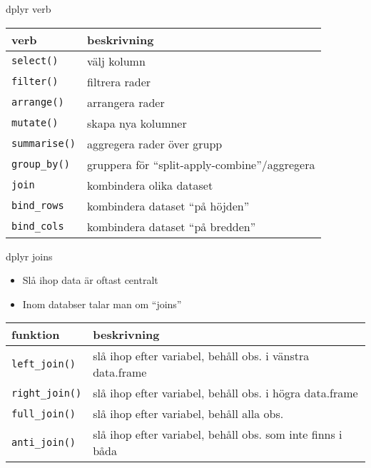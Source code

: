 \documentclass[
  11pt,
  ignorenonframetext,
  handout]{beamer}
\providecommand{\tightlist}{%
  \setlength{\itemsep}{0pt}\setlength{\parskip}{0pt}}
\begin{document}
\begin{frame}[fragile]{dplyr verb}
\protect\hypertarget{dplyr-verb}{}
\begin{longtable}[]{@{}ll@{}}
\toprule
verb & beskrivning \\
\midrule
\endhead
\texttt{select()} & välj kolumn \\
\texttt{filter()} & filtrera rader \\
\texttt{arrange()} & arrangera rader \\
\texttt{mutate()} & skapa nya kolumner \\
\texttt{summarise()} & aggregera rader över grupp \\
\texttt{group\_by()} & gruppera för ``split-apply-combine''/aggregera \\
\texttt{join} & kombindera olika dataset \\
\texttt{bind\_rows} & kombindera dataset ``på höjden'' \\
\texttt{bind\_cols} & kombindera dataset ``på bredden'' \\
\bottomrule
\end{longtable}
\end{frame}

\begin{frame}[fragile]{dplyr joins}
\protect\hypertarget{dplyr-joins}{}
\begin{itemize}
\tightlist
\item
  Slå ihop data är oftast centralt
\item
  Inom databser talar man om ``joins''
\end{itemize}

\begin{longtable}[]{@{}ll@{}}
\toprule
funktion & beskrivning \\
\midrule
\endhead
\texttt{left\_join()} & slå ihop efter variabel, behåll obs. i vänstra
data.frame \\
\texttt{right\_join()} & slå ihop efter variabel, behåll obs. i högra
data.frame \\
\texttt{full\_join()} & slå ihop efter variabel, behåll alla obs. \\
\texttt{anti\_join()} & slå ihop efter variabel, behåll obs. som inte
finns i båda \\
\bottomrule
\end{longtable}
\end{frame}
\end{document}
